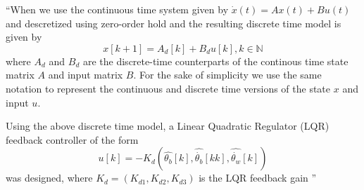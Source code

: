 ``When we use the continuous time system given by $\dot{x}(t) = Ax(t) + Bu(t)$ and descretized using zero-order hold and the resulting discrete time model is given by
\begin{equation}
 x[k+1]=A_{d}[k]+B_{d}u[k], k\in \mathbb{N}
\end{equation}
where $A_{d}$ and $B_{d}$ are the discrete-time counterparts of the continous time state matrix $A$ and input matrix $B$.
For the sake of simplicity we use the same notation to represent the continuous and discrete time versions of the state $x$ and input $u$.

Using the above discrete time model, a Linear Quadratic Regulator (LQR) feedback controller of the form 
\begin{equation}
 u[k]=-K_{d}(\hat{\theta_{b}}[k],\hat{\dot{\theta_{b}}}[kk],\hat{\dot{\theta_{w}}}[k])
\end{equation}
was designed, where $K_{d}=(K_{d1},K_{d2},K_{d3})$ is the LQR feedback gain ''\cite{cubli12}

 
 
 
 
 
 
 
 
 
 


